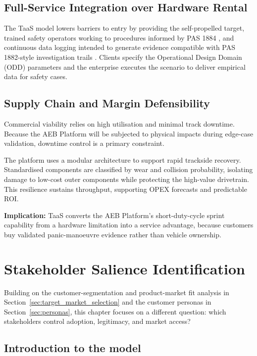 \documentclass[11pt, a4paper]{report}
\numberwithin{equation}{section}
\begin{document}
\begin{refsection}
\subsection{Full-Service Integration over Hardware Rental}

The TaaS model lowers barriers to entry by providing the self-propelled target, trained safety operators working to procedures informed by PAS 1884 \cite{pas1884}, and continuous data logging intended to generate evidence compatible with PAS 1882-style investigation trails \cite{pas1882}. Clients specify the Operational Design Domain (ODD) parameters and the enterprise executes the scenario to deliver empirical data for safety cases.

\subsection{Supply Chain and Margin Defensibility}

Commercial viability relies on high utilisation and minimal track downtime. Because the AEB Platform will be subjected to physical impacts during edge-case validation, downtime control is a primary constraint.

The platform uses a modular architecture to support rapid trackside recovery. Standardised components are classified by wear and collision probability, isolating damage to low-cost outer components while protecting the high-value drivetrain. This resilience sustains throughput, supporting OPEX forecasts and predictable ROI.

\noindent\textbf{Implication:} TaaS converts the AEB Platform's short-duty-cycle sprint capability from a hardware limitation into a service advantage, because customers buy validated panic-manoeuvre evidence rather than vehicle ownership.

\section{Stakeholder Salience Identification}
\label{sec:stakeholder_salience_identification}

Building on the customer-segmentation and product-market fit analysis in Section~\ref{sec:target_market_selection} and the customer personas in Section~\ref{sec:personas}, this chapter focuses on a different question: which stakeholders control adoption, legitimacy, and market access?

\subsection{Introduction to the model}


\end{refsection}
\end{document}
